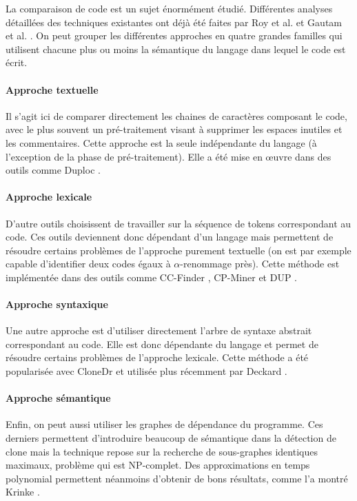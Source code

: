 La comparaison de code est un sujet énormément étudié.  Différentes
analyses détaillées des techniques existantes ont déjà été faites par
Roy et al. \cite{ComparisonAndEvaluation} et Gautam et
al. \cite{variousCodeClone}.  On peut grouper les différentes
approches en quatre grandes familles qui utilisent chacune plus ou
moins la sémantique du langage dans lequel le code est écrit.

\paragraph{Approche textuelle}
Il s'agit ici de comparer directement les chaines de caractères
composant le code, avec le plus souvent un pré-traitement visant à
supprimer les espaces inutiles et les commentaires. Cette approche est
la seule indépendante du langage (à l'exception de la phase de
pré-traitement). Elle a été mise en œuvre dans des outils comme Duploc
\cite{ALanguageIndependent}.

\paragraph{Approche lexicale}
D'autre outils choisissent de travailler sur la séquence de tokens
correspondant au code. Ces outils deviennent donc dépendant d'un
langage mais permettent de résoudre certains problèmes de l'approche
purement textuelle (on est par exemple capable d'identifier deux codes
égaux à $\alpha$-renommage près).  Cette méthode est implémentée dans
des outils comme CC-Finder \cite{ccfinder}, CP-Miner \cite{cpminer} et
DUP \cite{dup}.

\paragraph{Approche syntaxique}
Une autre approche est d'utiliser directement l'arbre de syntaxe
abstrait correspondant au code. Elle est donc dépendante du langage et
permet de résoudre certains problèmes de l'approche lexicale. Cette
méthode a été popularisée avec CloneDr \cite{CloneDetectionUsingAST}
et utilisée plus récemment par Deckard \cite{Deckard}.

\paragraph{Approche sémantique}
Enfin, on peut aussi utiliser les graphes de dépendance
\cite{PdgOrigin} du programme. Ces derniers permettent d'introduire
beaucoup de sémantique dans la détection de clone mais la technique
repose sur la recherche de sous-graphes identiques maximaux, problème
qui est NP-complet. Des approximations en temps polynomial permettent
néanmoins d'obtenir de bons résultats, comme l'a montré Krinke
\cite{PDG}.
